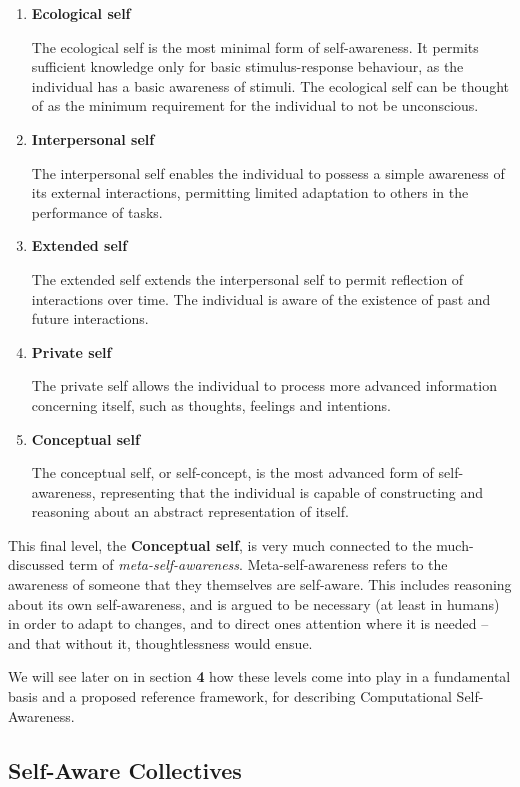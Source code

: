 	\begin{enumerate}
		\item \textbf{Ecological self}
		
		The ecological self is the most minimal form of self-awareness. It permits sufficient knowledge only for basic stimulus-response behaviour, as the individual has a basic awareness of stimuli. The ecological self can be thought of as the minimum requirement for the individual to not be unconscious.
		\item \textbf{Interpersonal self}
		
		The interpersonal self enables the individual to possess a simple awareness of its external interactions, permitting limited adaptation to others in the performance of tasks.
		\item \textbf{Extended self}
		
		The extended self extends the interpersonal self to permit reflection of interactions over time. The individual is aware of the existence of past and future interactions.
		\item \textbf{Private self}
		
		The private self allows the individual to process more advanced information concerning itself, such as thoughts, feelings and intentions.
		
		\item \textbf{Conceptual self}
		
		The conceptual self, or self-concept, is the most advanced form of self-awareness, representing that the individual is capable of constructing and reasoning about an abstract representation of itself.
	\end{enumerate}

	This final level, the \textbf{Conceptual self}, is very much connected to the much-discussed term of \textit{meta-self-awareness}. Meta-self-awareness refers to the awareness of someone that they themselves are self-aware. This includes reasoning about its own self-awareness, and is argued to be necessary (at least in humans) in order to adapt to changes, and to direct ones attention where it is needed -- and that without it, thoughtlessness would ensue.

	We will see later on in section \textbf{4} how these levels come into play in a fundamental basis and a proposed reference framework, for describing Computational Self-Awareness.


	\subsection{Self-Aware Collectives}

